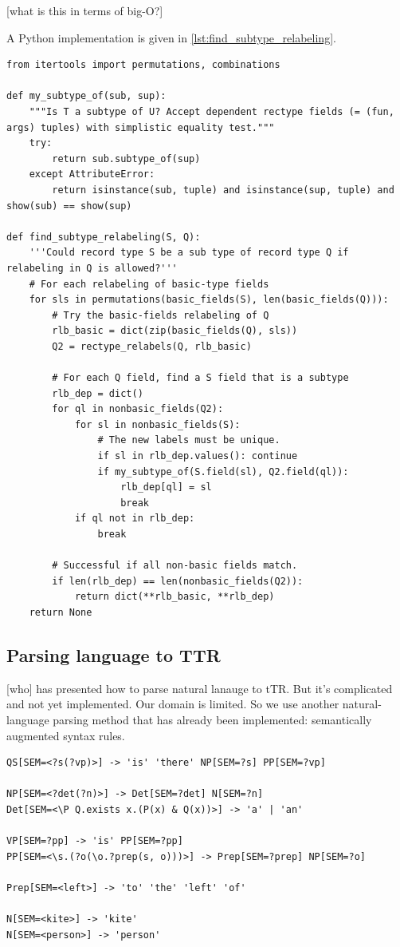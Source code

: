 [what is this in terms of big-O?]

A Python implementation is given in \autoref{lst:find_subtype_relabeling}.

\begin{lstlisting}[label={lst:find_subtype_relabeling}, caption=The \texttt{find\_subtype\_relabeling} function]
from itertools import permutations, combinations

def my_subtype_of(sub, sup):
    """Is T a subtype of U? Accept dependent rectype fields (= (fun, args) tuples) with simplistic equality test."""
    try:
        return sub.subtype_of(sup)
    except AttributeError:
        return isinstance(sub, tuple) and isinstance(sup, tuple) and show(sub) == show(sup)

def find_subtype_relabeling(S, Q):
    '''Could record type S be a sub type of record type Q if relabeling in Q is allowed?'''
    # For each relabeling of basic-type fields
    for sls in permutations(basic_fields(S), len(basic_fields(Q))):
        # Try the basic-fields relabeling of Q
        rlb_basic = dict(zip(basic_fields(Q), sls))
        Q2 = rectype_relabels(Q, rlb_basic)
        
        # For each Q field, find a S field that is a subtype
        rlb_dep = dict()
        for ql in nonbasic_fields(Q2):
            for sl in nonbasic_fields(S):
                # The new labels must be unique.
                if sl in rlb_dep.values(): continue
                if my_subtype_of(S.field(sl), Q2.field(ql)):
                    rlb_dep[ql] = sl
                    break
            if ql not in rlb_dep:
                break

        # Successful if all non-basic fields match.
        if len(rlb_dep) == len(nonbasic_fields(Q2)):
            return dict(**rlb_basic, **rlb_dep)
    return None
\end{lstlisting}



\subsection{Parsing language to TTR}

[who] has presented how to parse natural lanauge to tTR.
But it's complicated and not yet implemented.
Our domain is limited.
So we use another natural-language parsing method that has already been implemented: semantically augmented syntax rules.

\begin{lstlisting}[label={lst:grammar}, caption=A snippet of the FCFG grammar]
QS[SEM=<?s(?vp)>] -> 'is' 'there' NP[SEM=?s] PP[SEM=?vp]

NP[SEM=<?det(?n)>] -> Det[SEM=?det] N[SEM=?n]
Det[SEM=<\P Q.exists x.(P(x) & Q(x))>] -> 'a' | 'an'

VP[SEM=?pp] -> 'is' PP[SEM=?pp]
PP[SEM=<\s.(?o(\o.?prep(s, o)))>] -> Prep[SEM=?prep] NP[SEM=?o]

Prep[SEM=<left>] -> 'to' 'the' 'left' 'of'

N[SEM=<kite>] -> 'kite'
N[SEM=<person>] -> 'person'
\end{lstlisting}



